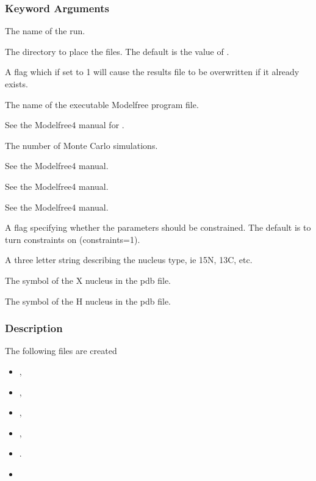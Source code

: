   
 \subsubsection{Keyword Arguments} 

   The name of the run.   

   The directory to place the files.  The default is the value of .   

   A flag which if set to 1 will cause the results file to be overwritten if it already exists.   

   The name of the executable Modelfree program file.   

   See the Modelfree4 manual for .   

   The number of Monte Carlo simulations.   

   See the Modelfree4 manual.   

   See the Modelfree4 manual.   

   See the Modelfree4 manual.   

   A flag specifying whether the parameters should be constrained.  The default is to turn constraints on (constraints=1).   

   A three letter string describing the nucleus type, ie 15N, 13C, etc.   

   The symbol of the X nucleus in the pdb file.   

   The symbol of the H nucleus in the pdb file.  

  

  
 \subsubsection{Description} 

 The following files are created 
  

 \begin{itemize} 
 \item[] ,  
 \item[] ,  
 \item[] ,  
 \item[] ,  
 \item[] .  
 \item[]  
 \end{itemize} 
  

